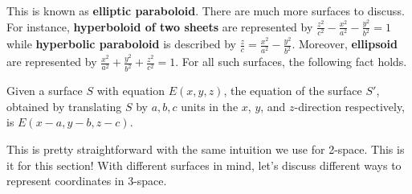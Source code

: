 \documentclass[../../../main.tex]{subfiles}
\begin{document}
This is known as \textbf{elliptic paraboloid}. There are much more
surfaces to discuss. For instance, \textbf{hyperboloid of two sheets}
are represented by $\frac{z^2}{c^2} - \frac{x^2}{a^2} -
\frac{y^2}{b^2} = 1$ while \textbf{hyperbolic paraboloid} is described
by $\frac{z}{c} = \frac{x^2}{a^2} - \frac{y^2}{b^2}$. Moreover,
\textbf{ellipsoid} are represented by $\frac{x^2}{a^2} +
\frac{y^2}{b^2} + \frac{z^2}{c^2} = 1$. For all such surfaces,
the following fact holds.

\begin{important}
Given a surface $S$ with equation $E(x, y, z)$, the equation of the
surface $S'$, obtained by translating $S$ by $a, b, c$ units in the
$x$, $y$, and $z$-direction respectively, is $E(x - a, y - b, z - c)$.
\end{important}

This is pretty straightforward with the same intuition we use for
2-space. This is it for this section! With different surfaces in
mind, let's discuss different ways to represent coordinates in
3-space.
\end{document}
